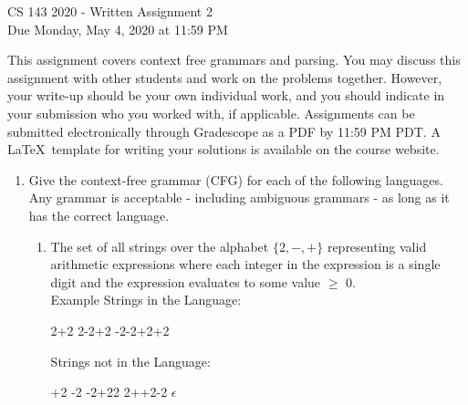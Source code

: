 \documentclass[11pt]{article}
\newcommand\tab[1][1cm]{\hspace*{#1}}
\begin{document}
\begin{center}
\LARGE CS 143 2020 - Written Assignment 2 \\
\large Due Monday, May 4, 2020 at 11:59 PM
\end{center}
This assignment covers context free grammars and parsing. You may discuss this assignment with other students and work on the problems together. However, your write-up should be your own individual work, and you should indicate in your submission who you worked with, if applicable. Assignments can be submitted electronically through Gradescope as a PDF by 11:59 PM PDT. A \LaTeX \ template for writing your solutions is available on the course website.

\begin{enumerate}
  \item  Give the context-free grammar (CFG) for each of the following languages. Any grammar is acceptable - including ambiguous grammars -  as long as it has the correct language.
  \begin{enumerate}
    \item The set of all strings over the alphabet $\{2, -, + \}$ representing valid arithmetic expressions where each integer in the expression is a single digit and the expression evaluates to some value $\geq$ 0. \\ 
    Example Strings in the Language: 
    \begin{center}
    2+2 \tab \tab 2-2+2 \tab \tab -2-2+2+2  
    \end{center}
    Strings not in the Language: 
    \begin{center}
        +2 \tab \tab -2  \tab \tab -2+22 \tab \tab 2++2-2 \tab \tab $\epsilon$ 
    \end{center}
    

\end{enumerate}
\end{enumerate}
\end{document}
